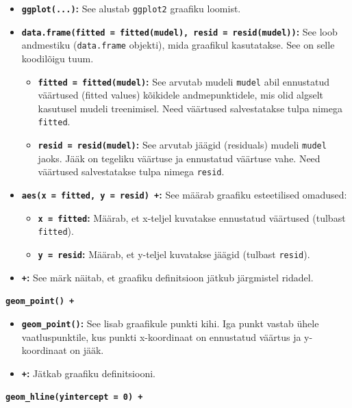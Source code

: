 \documentclass[
]{book}
\providecommand{\tightlist}{%
  \setlength{\itemsep}{0pt}\setlength{\parskip}{0pt}}
\theoremstyle{definition}
\theoremstyle{definition}
\theoremstyle{definition}
\theoremstyle{definition}
\theoremstyle{remark}
\begin{document}
\begin{itemize}
\tightlist
\item
  \textbf{\texttt{ggplot(...)}:} See alustab \texttt{ggplot2} graafiku loomist.
\item
  \textbf{\texttt{data.frame(fitted\ =\ fitted(mudel),\ resid\ =\ resid(mudel))}:} See loob andmestiku (\texttt{data.frame} objekti), mida graafikul kasutatakse. See on selle koodilõigu tuum.

  \begin{itemize}
  \tightlist
  \item
    \textbf{\texttt{fitted\ =\ fitted(mudel)}:} See arvutab mudeli \texttt{mudel} abil ennustatud väärtused (fitted values) kõikidele andmepunktidele, mis olid algselt kasutusel mudeli treenimisel. Need väärtused salvestatakse tulpa nimega \texttt{fitted}.
  \item
    \textbf{\texttt{resid\ =\ resid(mudel)}:} See arvutab jäägid (residuals) mudeli \texttt{mudel} jaoks. Jääk on tegeliku väärtuse ja ennustatud väärtuse vahe. Need väärtused salvestatakse tulpa nimega \texttt{resid}.
  \end{itemize}
\item
  \textbf{\texttt{aes(x\ =\ fitted,\ y\ =\ resid)\ +}:} See määrab graafiku esteetilised omadused:

  \begin{itemize}
  \tightlist
  \item
    \textbf{\texttt{x\ =\ fitted}:} Määrab, et x-teljel kuvatakse ennustatud väärtused (tulbast \texttt{fitted}).
  \item
    \textbf{\texttt{y\ =\ resid}:} Määrab, et y-teljel kuvatakse jäägid (tulbast \texttt{resid}).
  \end{itemize}
\item
  \textbf{\texttt{+}:} See märk näitab, et graafiku definitsioon jätkub järgmistel ridadel.
\end{itemize}

\textbf{\texttt{geom\_point()\ +}}

\begin{itemize}
\tightlist
\item
  \textbf{\texttt{geom\_point()}:} See lisab graafikule punkti kihi. Iga punkt vastab ühele vaatluspunktile, kus punkti x-koordinaat on ennustatud väärtus ja y-koordinaat on jääk.
\item
  \textbf{\texttt{+}:} Jätkab graafiku definitsiooni.
\end{itemize}

\textbf{\texttt{geom\_hline(yintercept\ =\ 0)\ +}}
\end{document}
